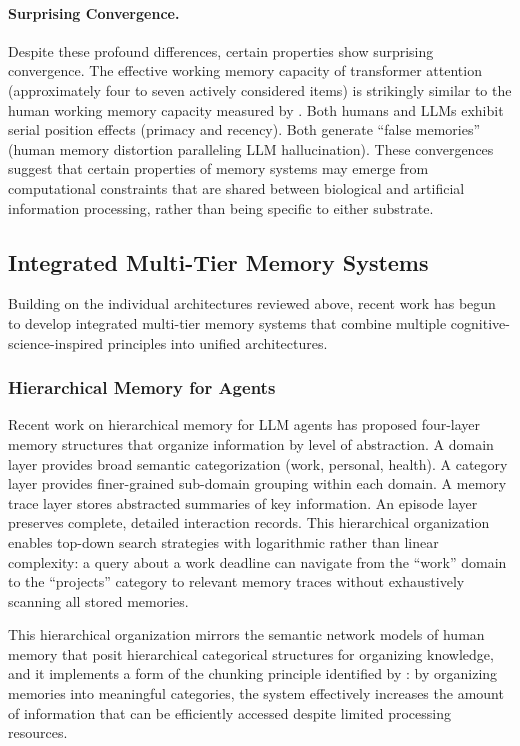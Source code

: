 \documentclass[11pt,letterpaper]{article}
\begin{document}
\paragraph{Surprising Convergence.} Despite these profound differences, certain properties show surprising convergence. The effective working memory capacity of transformer attention (approximately four to seven actively considered items) is strikingly similar to the human working memory capacity measured by \cite{cowan2001magical}. Both humans and LLMs exhibit serial position effects (primacy and recency). Both generate ``false memories'' (human memory distortion paralleling LLM hallucination). These convergences suggest that certain properties of memory systems may emerge from computational constraints that are shared between biological and artificial information processing, rather than being specific to either substrate.

\subsection{Integrated Multi-Tier Memory Systems}

Building on the individual architectures reviewed above, recent work has begun to develop integrated multi-tier memory systems that combine multiple cognitive-science-inspired principles into unified architectures.

\subsubsection{Hierarchical Memory for Agents}

Recent work on hierarchical memory for LLM agents has proposed four-layer memory structures that organize information by level of abstraction. A domain layer provides broad semantic categorization (work, personal, health). A category layer provides finer-grained sub-domain grouping within each domain. A memory trace layer stores abstracted summaries of key information. An episode layer preserves complete, detailed interaction records. This hierarchical organization enables top-down search strategies with logarithmic rather than linear complexity: a query about a work deadline can navigate from the ``work'' domain to the ``projects'' category to relevant memory traces without exhaustively scanning all stored memories.

This hierarchical organization mirrors the semantic network models of human memory that posit hierarchical categorical structures for organizing knowledge, and it implements a form of the chunking principle identified by \cite{miller1956magical}: by organizing memories into meaningful categories, the system effectively increases the amount of information that can be efficiently accessed despite limited processing resources.
\end{document}
